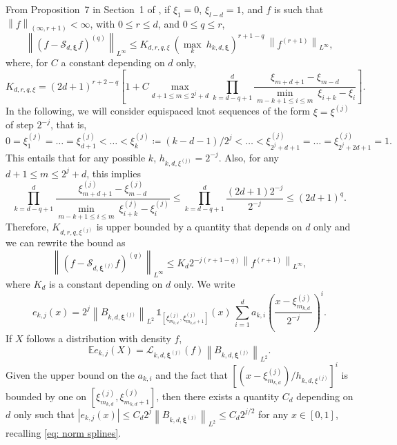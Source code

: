\documentclass[preprint]{imsart}
\newcommand\norm[1]{\left\lVert#1\right\rVert}
\numberwithin{equation}{section}
\begin{document}
From Proposition~7 in Section~1 of \cite{LycheSpline}, if $\xi_1=0$, $\xi_{l-d}=1$, and $f$ is such that $\norm{f}_{(\infty,r+1)}<\infty$, with $0\leq r \leq d$, and $0\leq q\leq r$,
\begin{equation}
    \norm{\left(f-\mathcal{S}_{d,\mathbf{\xi}}f\right)^{(q)}}_{L^\infty} \leq K_{d,r,q,\xi}\ (\max_k\ h_{k,d,\mathbf{\xi}})^{r+1-q}\ \norm{f^{(r+1)}}_{L^\infty},
\end{equation} 
where, for $C$ a constant depending on $d$ only,
\[ K_{d,r,q,\xi} = (2d+1)^{r+2-q}\left[1+C\max_{d+1\leq m\leq 2^j+d} \prod_{k=d-q+1}^d \frac{\xi_{m+d+1}-\xi_{m-d}}{\min_{m-k+1 \leq i\leq m}\ \xi_{i+k}-\xi_i}\right].\]
In the following, we will consider equispaced knot sequences of the form $\xi=\xi^{(j)}$ 
of step $2^{-j}$, that is, 
\begin{equation}\label{eq:knot seq multires}
0=\xi^{(j)}_1=\dots=\xi^{(j)}_{d+1}<\dots<\xi^{(j)}_k\coloneqq(k-d-1)/2^{j}<\dots<\xi^{(j)}_{2^j+d+1}=\dots=\xi^{(j)}_{2^j+2d+1}=1.
\end{equation}
This entails that for any possible $k$, $h_{k,d,\xi^{(j)}}= 2^{-j}$. Also, for any $d+1\leq m\leq 2^j+d$, this implies
\[\prod_{k=d-q+1}^d \frac{\xi^{(j)}_{m+d+1}-\xi^{(j)}_{m-d}}{\min_{m-k+1 \leq i\leq m}\ \xi^{(j)}_{i+k}-\xi^{(j)}_i} \leq \prod_{k=d-q+1}^d \frac{(2d+1)2^{-j}}{2^{-j}}\leq (2d+1)^q .\] 
Therefore, $K_{d,r,q,\xi^{(j)}}$ is upper bounded by a quantity that depends on $d$ only and we can rewrite the bound as
\begin{equation}\label{eq:bias}
    \norm{\left(f-\mathcal{S}_{d,\mathbf{\xi}^{(j)}}f\right)^{(q)}}_{L^\infty} \leq K_d 2^{-j(r+1-q)} \norm{f^{(r+1)}}_{L^\infty},
\end{equation} 
where $K_d$ is a constant depending  on $d$ only. We write 
\begin{equation}\label{eq: dual basis splines}
e_{k,j}(x)=2^j\norm{B_{k,d,\mathbf{\xi}^{(j)}}}_{L^2}\, \mathds{1}_{\left[\xi_{m_{k,d}}^{(j)}, \xi_{m_{k,d}+1}^{(j)}\right]}(x)\, \sum_{i=1}^d a_{k,i}\left(\frac{x-\xi_{m_{k,d}}^{(j)}}{2^{-j}}\right)^i.
\end{equation} 
If $X$ follows a distribution with density $f$, \[\mathbb{E}e_{k,j}(X)= \mathcal{L}_{k,d,\mathbf{\xi}^{(j)}}(f)\norm{B_{k,d,\mathbf{\xi}^{(j)}}}_{L^2}.\] Given the upper bound on the $a_{k,i}$ and the fact that $[(x-\xi^{(j)}_{m_{k,d}})/h_{k,d,\xi^{(j)}}]^i$ is bounded by one on $[\xi_{m_{k,d}}^{(j)}, \xi_{m_{k,d}+1}^{(j)}]$, then there exists a quantity $C_d$ depending on $d$ only such that $|e_{k,j}(x)|\leq C_d2^j \norm{B_{k,d,\mathbf{\xi}^{(j)}}}_{L^2} \leq C_d2^{j/2}$ for any $x\in[0,1]$, recalling \eqref{eq: norm splines}.
\end{document}
